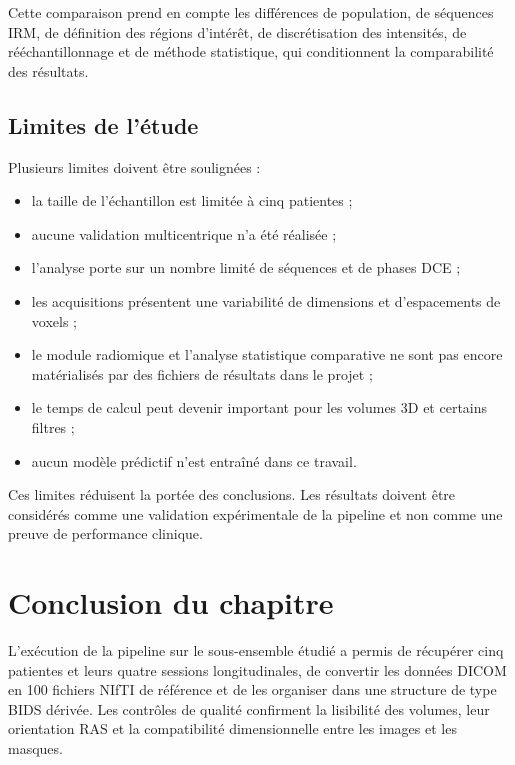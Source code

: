 Cette comparaison prend en compte les différences de population, de séquences IRM, de définition des régions d'intérêt, de discrétisation des intensités, de rééchantillonnage et de méthode statistique, qui conditionnent la comparabilité des résultats.

\subsection{Limites de l'étude}
\label{subsec:discussion_limites}

Plusieurs limites doivent être soulignées :

\begin{itemize}
    \item la taille de l'échantillon est limitée à cinq patientes ;
    \item aucune validation multicentrique n'a été réalisée ;
    \item l'analyse porte sur un nombre limité de séquences et de phases DCE ;
    \item les acquisitions présentent une variabilité de dimensions et d'espacements de voxels ;
    \item le module radiomique et l'analyse statistique comparative ne sont pas encore matérialisés par des fichiers de résultats dans le projet ;
    \item le temps de calcul peut devenir important pour les volumes 3D et certains filtres ;
    \item aucun modèle prédictif n'est entraîné dans ce travail.
\end{itemize}

Ces limites réduisent la portée des conclusions. Les résultats doivent être considérés comme une validation expérimentale de la pipeline et non comme une preuve de performance clinique.

\section{Conclusion du chapitre}
\label{sec:conclusion_chapitre3}

L'exécution de la pipeline sur le sous-ensemble étudié a permis de récupérer cinq patientes et leurs quatre sessions longitudinales, de convertir les données DICOM en 100 fichiers NIfTI de référence et de les organiser dans une structure de type BIDS dérivée. Les contrôles de qualité confirment la lisibilité des volumes, leur orientation RAS et la compatibilité dimensionnelle entre les images et les masques.

